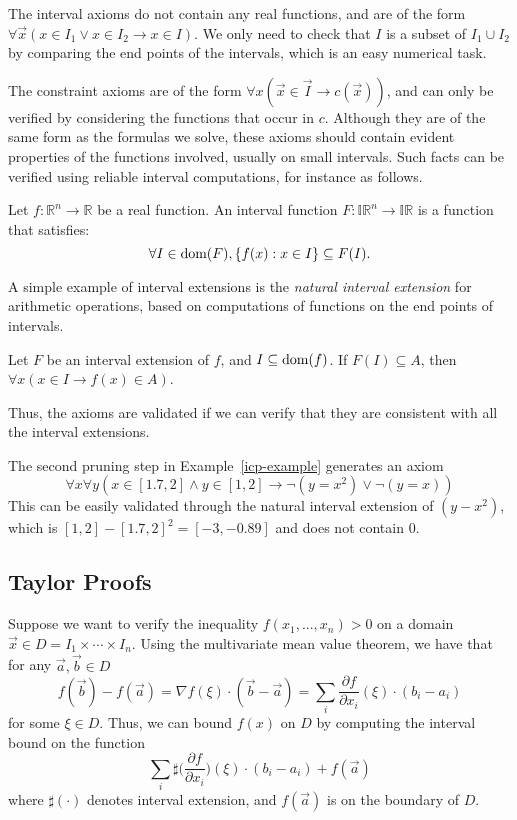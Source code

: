 \documentclass{llncs}
\begin{document}
The interval axioms do not contain any real functions, and are of the form
$\forall \vec x(x\in I_1\vee x\in I_2\rightarrow x\in I)$. We only need to
check that $I$ is a subset of $I_1\cup I_2$ by comparing the end points of the
intervals, which is an easy numerical task.

The constraint axioms are of the form $\forall x (\vec x\in \vec I \rightarrow
c(\vec x))$, and can only be verified by considering the functions that
occur in $c$. Although they are of the same form as the formulas we solve,
these axioms should contain evident properties of the functions involved,
usually on small intervals. Such facts can be verified using reliable interval
computations, for instance as follows.
\begin{definition}
Let $f: \mathbb{R}^n\rightarrow \mathbb{R}$ be a real function. An interval
function $F: \mathbb{IR}^n \rightarrow \mathbb{IR}$ is a function that
satisfies:
$$\forall I\in \mbox{dom}(F), \{f(x): x\in I\}\subseteq F(I).$$
\end{definition}
A simple example of interval extensions is the {\em natural interval
extension} for
arithmetic operations, based on computations of functions on the end points of
intervals.
\begin{proposition}
Let $F$ be an interval extension of $f$, and $I\subseteq \mbox{dom}(f)$. If
$F(I)\subseteq A$, then $\forall x (x\in I \rightarrow f(x)\in A)$.
\end{proposition}
Thus, the axioms are validated if we can verify that they are consistent with
all the interval extensions.
\begin{example}
The second pruning step in Example~\ref{icp-example} generates an axiom
$$\forall
x \forall y ( x\in [1.7, 2] \wedge y\in [1, 2] \rightarrow \neg (y=
x^2)\vee \neg (y=x))$$
This can be easily validated through the natural interval extension of
$(y-x^2)$, which is $[1,2]-[1.7,2]^2 = [-3, -0.89]$ and does not contain $0$.
\end{example}

\subsection{Taylor Proofs}
Suppose we want to verify the inequality $f(x_1,...,x_n) > 0$ on a domain $\vec x\in D = I_1\times \cdots \times I_n.$ Using the multivariate mean value theorem, we have that for any $\vec a, \vec b\in D$
$$f(\vec b) - f(\vec a) = \nabla f(\xi)\cdot (\vec b - \vec a) = \sum_i \frac{\partial f}{\partial x_i}(\xi)\cdot (b_i-a_i)$$
for some $\xi\in D$. Thus, we can bound $f(x)$ on $D$ by computing the interval bound on the function
$$\sum_i \sharp\bigg(\frac{\partial f}{\partial x_i}\bigg)(\xi)\cdot (b_i-a_i) + f(\vec a)$$
where $\sharp(\cdot)$ denotes interval extension, and $f(\vec a)$ is on the boundary of $D$.
\end{document}
